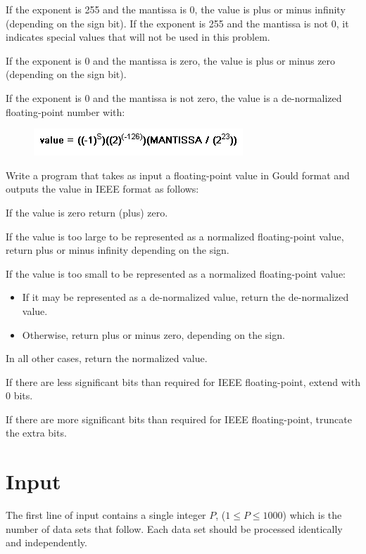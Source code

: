 If the exponent is 255 and the mantissa is 0, the value is plus or minus
infinity (depending on the sign bit).  If the exponent is 255 and the
mantissa is not 0, it indicates special values that will not be used in
this problem.

If the exponent is 0 and the mantissa is zero, the value is plus or
minus zero (depending on the sign bit).

If the exponent is 0 and the mantissa is not zero, the value is a
de-normalized floating-point number with:

\begin{figure}[!h]
    \begin{center}
        \includegraphics[]{c5.png} \\
    \end{center}
\end{figure}

Write a program that takes as input a floating-point value in Gould
format and outputs the value in IEEE format as follows:

If the value is zero return (plus) zero.

If the value is too large to be represented as a normalized floating-point
value, return plus or minus infinity depending on the sign.

If the value is too small to be represented as a normalized floating-point value:
\begin{itemize}
    \item If it may be represented as a de-normalized value, return the de-normalized value.
    \item Otherwise, return plus or minus zero, depending on the sign.
\end{itemize}

In all other cases, return the normalized value.

If there are less significant bits than required for IEEE floating-point, extend with 0 bits.

If there are more significant bits than required for IEEE floating-point, truncate the extra bits.

\section*{Input}

The first line of input contains a single integer $P$, 
($1 \le P \le 1000$) which is the number of data sets that follow.  
Each data set should be processed identically and independently.

